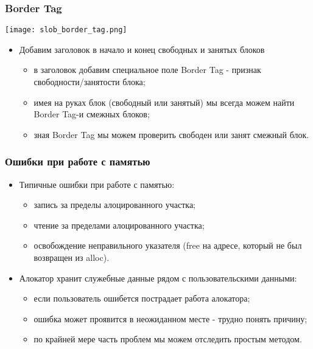\begin{frame}
\frametitle{Border Tag}
\begin{center}
  \texttt{[image: slob\_border\_tag.png]}
\end{center}
\begin{itemize}
  \item Добавим заголовок в начало и конец свободных и занятых блоков
  \begin{itemize}
    \item в заголовок добавим специальное поле Border Tag - признак
    свободности/занятости блока;
    \item имея на руках блок (свободный или занятый) мы всегда можем найти
    Border Tag-и смежных блоков;
    \item зная Border Tag мы можем проверить свободен или занят смежный блок.
  \end{itemize}
\end{itemize}
\end{frame}

\begin{frame}
\frametitle{Ошибки при работе с памятью}
\begin{itemize}
  \item Типичные ошибки при работе с памятью:
  \begin{itemize}
    \item запись за пределы алоцированного участка;
    \item чтение за пределами алоцированного участка;
    \item освобождение неправильного указателя (free на адресе, который не был
    возвращен из alloc).
  \end{itemize}
  \item Алокатор хранит служебные данные рядом с пользовательскими данными:
  \begin{itemize}
    \item если пользователь ошибется пострадает работа алокатора;
    \item ошибка может проявится в неожиданном месте - трудно понять причину;
    \item по крайней мере часть проблем мы можем отследить простым методом.
  \end{itemize}
\end{itemize}
\end{frame}

